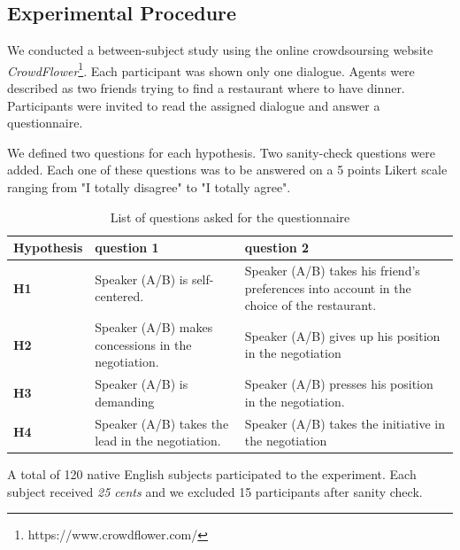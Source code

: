 \documentclass{llncs}
\begin{document}
		
	\subsection{Experimental Procedure}
	
	We conducted a between-subject study using the online crowdsoursing website \emph{CrowdFlower}\footnote{https://www.crowdflower.com/}. 
	Each participant was shown only one dialogue. Agents were described as two friends trying to find a restaurant where to have dinner. %
	Participants were invited to read the assigned dialogue and answer a questionnaire. 
	
	We defined  two questions for each hypothesis. Two sanity-check questions were added. Each one of these questions was to be answered on a 5 points Likert scale ranging from "I totally disagree" to "I totally agree".
	
	\begin{table}
		{\scriptsize
		\begin{tabular}{|p{1.75cm}|p{5cm}|p{5.5cm}|}
			\hline
			Hypothesis &question 1& question 2 \\
			\hline
			\textbf{H1} &Speaker (A/B) is self-centered. &Speaker (A/B) takes his friend's preferences into account in the choice of the restaurant.\\
			\hline
			\textbf{H2} &Speaker (A/B) makes concessions in the negotiation.&Speaker (A/B) gives up his position in the negotiation\\
			\hline
			\textbf{H3} & Speaker (A/B) is demanding&Speaker (A/B) presses his position in the negotiation. \\
			\hline
			\textbf{H4} &Speaker (A/B) takes the lead in the negotiation.&Speaker (A/B) takes the initiative in the negotiation \\
			\hline
		\end{tabular}
		}
		\caption{List of questions asked for the questionnaire}
		\label{table:questionnaire}
	\end{table}
		\vspace{-1em} 
	A total of 120 native English subjects participated to the experiment. Each subject received \textit{25 cents} and we excluded 15 participants after sanity check.
	
\end{document}

